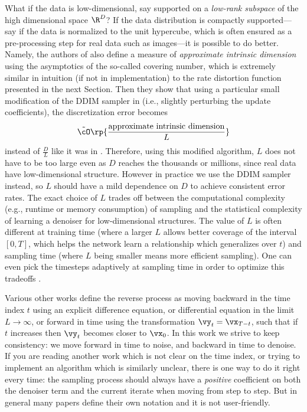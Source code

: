 \documentclass[../../book-main.tex]{subfiles}
\begin{document}
\begin{remark}
	What if the data is low-dimensional, say supported on a \textit{low-rank subspace} of the high dimensional space \(\R^{D}\)? If the data distribution is compactly supported---say if the data is normalized to the unit hypercube, which is often ensured as a pre-processing step for real data such as images---it is possible to do better. Namely, the authors of \cite{li2024d} also define a measure of \textit{approximate intrinsic dimension} using the asymptotics of the so-called covering number, which is extremely similar in intuition (if not in implementation) to the rate distortion function presented in the next Section. Then they show that using a particular small modification of the DDIM sampler in  (i.e., slightly perturbing the update coefficients), the discretization error becomes
	\begin{equation}
		\tilde{\cO}\rp{\frac{\text{approximate intrinsic dimension}}{L}}
	\end{equation}
	instead of \(\frac{D}{L}\) like it was in . Therefore, using this modified algorithm, \(L\) does not have to be too large even as \(D\) reaches the thousands or millions, since real data have low-dimensional structure. However in practice we use the DDIM sampler instead, so \(L\) should have a mild dependence on \(D\) to achieve consistent error rates. The exact choice of \(L\) trades off between the computational complexity (e.g., runtime or memory consumption) of sampling and the statistical complexity of learning a denoiser for low-dimensional structures. The value of \(L\) is often different at training time (where a larger \(L\) allows better coverage of the interval \([0, T]\), which helps the network learn a relationship which generalizes over \(t\)) and sampling time (where \(L\) being smaller means more efficient sampling). One can even pick the timesteps adaptively at sampling time in order to optimize this tradeoffs \cite{bao2022analytic}.
\end{remark}

\begin{remark}
	Various other works define the reverse process as moving backward in the time index \(t\) using an explicit difference equation, or differential equation in the limit \(L \to \infty\), or forward in time using the transformation \(\vy_{t} = \vx_{T - t}\), such that if \(t\) increases then \(\vy_{t}\) becomes closer to \(\vx_{0}\). In this work we strive to keep consistency: we move forward in time to noise, and backward in time to denoise. If you are reading another work which is not clear on the time index, or trying to implement an algorithm which is similarly unclear, there is one way to do it right every time: the sampling process should always have a \textit{positive} coefficient on both the denoiser term and the current iterate when moving from step to step. But in general many papers define their own notation and it is not user-friendly.
\end{remark}
\end{document}
